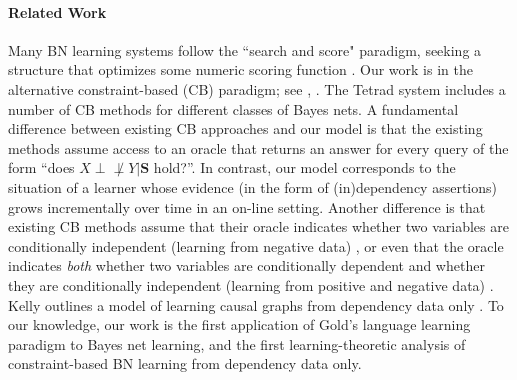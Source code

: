 \documentclass{elsarticle}%
\newcommand{\dep}{\ensuremath{{\perp{}\!\!\!\!\!\!\!\not  \perp{}}}}
\begin{document}
\paragraph{Related Work} Many BN learning systems follow the ``search and score" paradigm, seeking a structure that optimizes some numeric scoring function \cite{cooper99:_comput_causat_discov}.
Our work is in the alternative constraint-based (CB) paradigm; see
\cite{cooper99:_comput_causat_discov},
\cite[Ch.10]{neapolitan04:_learn_bayes_networ}.
The Tetrad system \cite{scheines96:_tetrad}
includes a number of CB methods for different classes of Bayes nets.
A fundamental difference between existing CB approaches and our model is that the existing methods assume access to an oracle that returns an answer for every query of the form ``does $X \dep Y |\mathbf{S}$ hold?''.
In contrast, our model corresponds to the situation of a learner whose evidence
(in the form of (in)dependency assertions)
grows incrementally over time in an on-line setting. Another difference is that existing CB methods assume that their oracle indicates whether two variables are conditionally independent (learning from negative data) \cite[Ch.5.4]{peter00:_causat}, or even that the oracle indicates
\emph{both} whether two variables are conditionally dependent
and whether they are conditionally independent (learning from positive and negative data)  \cite{cooper99:_comput_causat_discov}.  %
Kelly outlines a model of learning causal graphs from dependency data only \cite{bib:kev-causal}.
 To our knowledge, our work is the first application of Gold's language learning paradigm
to Bayes net learning, and the first learning-theoretic analysis of constraint-based BN learning from dependency data only.
\end{document}
